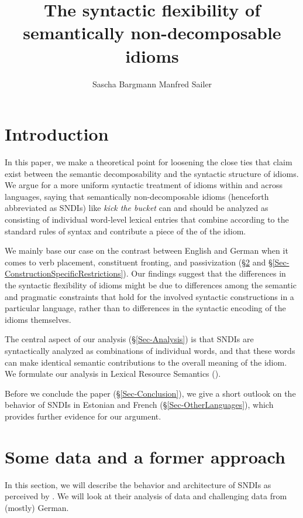 \documentclass[output=paper]{langsci/langscibook}
\author{Sascha Bargmann\affiliation{Goethe University Frankfurt/Main, Germany}\lastand 
Manfred Sailer\affiliation{Goethe University Frankfurt/Main, Germany}}
\title{The syntactic flexibility of semantically non-decomposable idioms}
\begin{document}
\section{Introduction}\label{ch01:Sec-Introduction}

In this paper, we make a theoretical point for loosening the close ties that \cite{Nunberg1994} claim exist between the semantic decomposability and the syntactic structure of idioms. We argue for a more uniform syntactic treatment of idioms within and across languages, saying that  semantically non-decomposable idioms (henceforth abbreviated as SNDIs) like \textit{kick the bucket} can and should be analyzed as consisting of individual word-level lexical entries that combine according to the standard rules of syntax and contribute a piece of the  of the idiom.

We mainly base our case on the contrast between English and German when it comes to verb placement, constituent fronting, and passivization (§\ref{Sec-SyntacticSemanticFlexibility} and §\ref{Sec-ConstructionSpecificRestrictions}). Our findings suggest that the differences in the syntactic flexibility of idioms might be due to differences among the semantic and pragmatic constraints that hold for the involved syntactic constructions in a particular language, rather than to differences in the syntactic encoding of the idioms themselves.

The central aspect of our analysis (§\ref{Sec-Analysis}) is that SNDIs are syntactically analyzed as combinations of individual words, and that these words can make identical semantic contributions to the overall meaning of the idiom. We formulate our analysis in  
Lexical Resource Semantics (\citealt{Richter:Sailer:04}).

Before we conclude the paper (§\ref{Sec-Conclusion}), we give a short outlook on the behavior of SNDIs in Estonian and French (§\ref{Sec-OtherLanguages}), which provides further evidence for our argument.



\section{Some data and a former approach}
\label{Sec-SyntacticSemanticFlexibility}

In this section, we will describe the behavior and architecture of SNDIs as perceived by \cite{Nunberg1994}. We will look at their analysis of  data and challenging data from (mostly) German.
\end{document}
